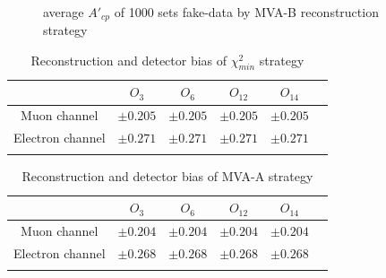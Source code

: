 		\begin{figure}[H]
			\centering
				\\
		\caption{average $A'_{cp}$ of 1000 sets fake-data by MVA-B reconstruction strategy}
		\label{AsymBias:fig:a05_noMlbcut_DetBias}
		\end{figure}
		\FloatBarrier


		\begin{center}
		\begin{longtable}[H]{ c c c c c c }
		\caption{Reconstruction and detector bias of $\chi^2_{min}$ strategy}\\
		\hline
		[\%] & $O_{3}$ & $O_{6}$ & $O_{12}$ & $O_{14}$ \\ 
		\hline{}
		Muon channel & $\pm0.205$ & $\pm0.205$ & $\pm0.205$ & $\pm0.205$ \\
		Electron channel & $\pm0.271$ & $\pm0.271$ & $\pm0.271$ & $\pm0.271$ \\
		\hline
		\label{AsymBias:tb:chi2_DetBias}
		\end{longtable}
		\end{center}

		\begin{center}
		\begin{longtable}[H]{ c c c c c c }
		\caption{Reconstruction and detector bias of MVA-A strategy}\\
		\hline
		[\%] & $O_{3}$ & $O_{6}$ & $O_{12}$ & $O_{14}$ \\ 
		\hline{}
		Muon channel & $\pm0.204$ & $\pm0.204$ & $\pm0.204$ & $\pm0.204$ \\
		Electron channel & $\pm0.268$ & $\pm0.268$ & $\pm0.268$ & $\pm0.268$ \\
		\hline
		\label{AsymBias:tb:a05_Mlbcut_DetBias}
		\end{longtable}
		\end{center}

